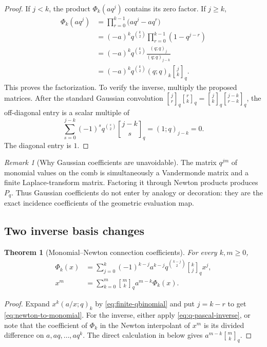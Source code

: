 \documentclass[11pt,a4paper,oneside]{article}
\newtheorem{theorem}{Theorem}[section]
\theoremstyle{definition}
\theoremstyle{remark}
\newtheorem{remark}[remark]{Remark}
\newcommand{\qbinom}[3]{\genfrac{[}{]}{0pt}{}{#1}{#2}_{#3}}
\begin{document}
\begin{proof}
If $j<k$, the product $\Phi_k(aq^j)$ contains its zero factor.  If $j\ge k$,
\begin{align*}
 \Phi_k(aq^j)
 &=\prod_{r=0}^{k-1}\bigl(aq^j-aq^r\bigr)\\
 &=(-a)^kq^{\binom k2}
   \prod_{r=0}^{k-1}(1-q^{j-r})\\
 &=(-a)^kq^{\binom k2}\frac{(q;q)_j}{(q;q)_{j-k}}\\
 &=(-a)^kq^{\binom k2}(q;q)_k\qbinom jkq.
\end{align*}
This proves the factorization.  To verify the inverse, multiply the proposed
matrices.  After the standard Gaussian convolution
\(
 \qbinom jrq\qbinom rkq=\qbinom jkq\qbinom{j-k}{r-k}q
\), the off-diagonal entry is a scalar multiple of
\[
 \sum_{s=0}^{j-k}(-1)^sq^{\binom s2}\qbinom{j-k}{s}q
 =(1;q)_{j-k}=0.
\]
The diagonal entry is $1$.
\end{proof}

\begin{remark}[Why Gaussian coefficients are unavoidable]
The matrix $q^{jm}$ of monomial values on the comb is simultaneously a
Vandermonde matrix and a finite Laplace-transform matrix.  Factoring it through
Newton products produces $P_q$.  Thus Gaussian coefficients do not enter by
analogy or decoration: they are the exact incidence coefficients of the
geometric evaluation map.
\end{remark}

\subsection{Two inverse basis changes}

\begin{theorem}[Monomial--Newton connection coefficients]
\label{thm:basis-change}
For every $k,m\ge0$,
\begin{align}
 \Phi_k(x)
 &=\sum_{j=0}^k(-1)^{k-j}a^{k-j}
 q^{\binom{k-j}{2}}\qbinom kjq x^j,
 \label{eq:newton-to-monomial}\\
 x^m
 &=\sum_{k=0}^m\qbinom mkq a^{m-k}\Phi_k(x).
 \label{eq:monomial-to-newton}
\end{align}
\end{theorem}

\begin{proof}
Expand $x^k(a/x;q)_k$ by \eqref{eq:finite-qbinomial} and put $j=k-r$ to get
\eqref{eq:newton-to-monomial}.  For the inverse, either apply
\eqref{eq:q-pascal-inverse}, or note that the coefficient of $\Phi_k$ in the
Newton interpolant of $x^m$ is its divided difference on
$a,aq,\ldots,aq^k$.  The direct calculation in 
below gives $a^{m-k}\qbinom mkq$.
\end{proof}
\end{document}
